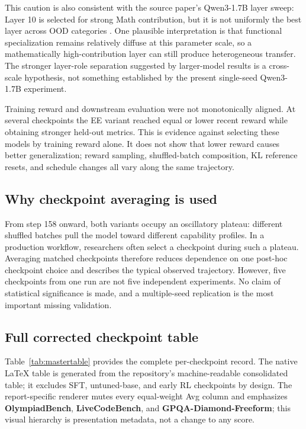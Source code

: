 \documentclass[10pt]{article}
\begin{document}
This caution is also consistent with the source paper's Qwen3-1.7B layer sweep:
Layer 10 is selected for strong Math contribution, but it is not uniformly the
best layer across OOD categories \citep{zhang2026onelayer}.  One plausible
interpretation is that functional specialization remains relatively diffuse at
this parameter scale, so a mathematically high-contribution layer can still
produce heterogeneous transfer.  The stronger layer-role separation suggested
by larger-model results is a cross-scale hypothesis, not something established
by the present single-seed Qwen3-1.7B experiment.

Training reward and downstream evaluation were not monotonically aligned.  At
several checkpoints the EE variant reached equal or lower recent reward while
obtaining stronger held-out metrics.  This is evidence against selecting these
models by training reward alone.  It does not show that lower reward causes
better generalization; reward sampling, shuffled-batch composition, KL
reference resets, and schedule changes all vary along the same trajectory.

\subsection{Why checkpoint averaging is used}

From step 158 onward, both variants occupy an oscillatory plateau: different
shuffled batches pull the model toward different capability profiles.  In a
production workflow, researchers often select a checkpoint during such a
plateau.  Averaging matched checkpoints therefore reduces dependence on one
post-hoc checkpoint choice and describes the typical observed trajectory.
However, five checkpoints from one run are not five independent experiments.
No claim of statistical significance is made, and a multiple-seed replication
is the most important missing validation.

\subsection{Full corrected checkpoint table}

Table~\ref{tab:mastertable} provides the complete per-checkpoint record.  The
native LaTeX table is generated from the repository's machine-readable consolidated table;
it excludes SFT, untuned-base, and early RL checkpoints by design.  The
report-specific renderer mutes every equal-weight Avg column and emphasizes
\textbf{OlympiadBench}, \textbf{LiveCodeBench}, and
\textbf{GPQA-Diamond-Freeform}; this visual hierarchy
is presentation metadata, not a change to any score.
\end{document}
